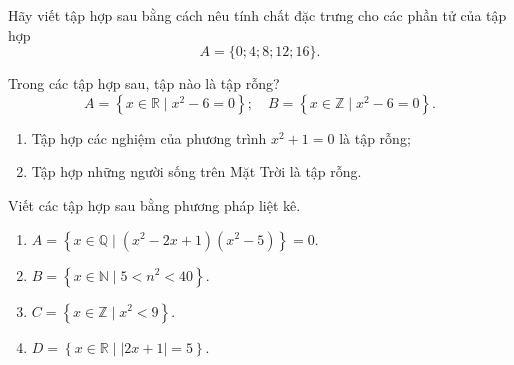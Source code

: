 \begin{bt}%
	Hãy viết tập hợp sau bằng cách nêu tính chất đặc trưng cho các phần tử của tập hợp
	$$A=\{0; 4; 8; 12; 16\}.$$
\end{bt}

\begin{bt}%
	Trong các tập hợp sau, tập nào là tập rỗng?
	$$A=\left\{x \in \mathbb{R} \mid x^{2}-6=0\right\}; \quad B=\left\{x \in \mathbb{Z} \mid x^{2}-6=0\right\}.$$
\end{bt}

\begin{bt}%
	\begin{enumerate}
		\item Tập hợp các nghiệm của phương trình $x^2+1=0$ là tập rỗng;
		\item Tập hợp những người sống trên Mặt Trời là tập rỗng.
	\end{enumerate}
\end{bt}

\begin{bt}%
	Viết các tập hợp sau bằng phương pháp liệt kê.
	\begin{enumerate}
		\item $A=\left\lbrace  x\in \mathbb{Q}\mid (x^2-2x+1)(x^2-5)\right\rbrace=0$.
		\item $B=\left\lbrace x \in \mathbb{N}\mid 5<n^2<40\right\rbrace$.
		\item $C=\left\lbrace x\in \mathbb{Z}\mid x^2<9\right\rbrace$.
		\item $D=\left\lbrace x\in \mathbb{R}\mid \left|2x+1\right|=5\right\rbrace$.
	\end{enumerate}
\end{bt}

